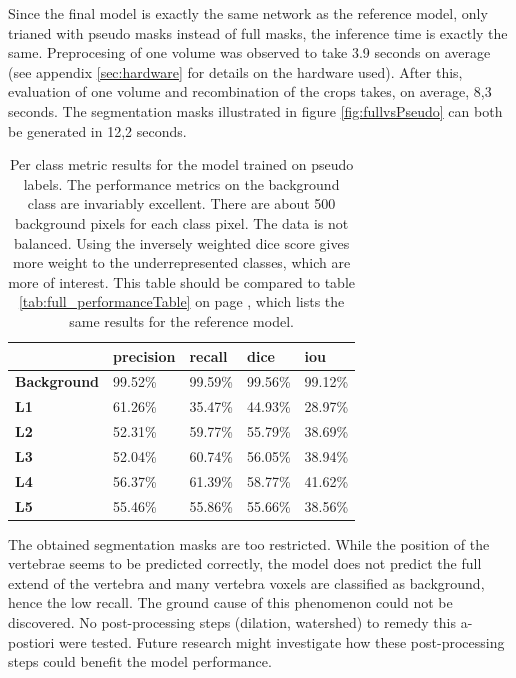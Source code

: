 \par{
    Since the final model is exactly the same network as the reference model, only trianed with pseudo masks instead of full masks, the inference time is exactly the same.
Preprocesing of one volume was observed to take 3.9 seconds on average (see appendix \ref{sec:hardware} for details on the hardware used).
After this, evaluation of one volume and recombination of the crops takes, on average, 8,3 seconds.
The segmentation masks illustrated in figure \ref{fig:fullvsPseudo} can both be generated in 12,2 seconds.
}

\begin{table}
    \begin{tabular}{l|llll}
        \toprule
                            & \textbf{precision} & \textbf{recall} & \textbf{dice} & \textbf{iou} \\ \hline
\textbf{Background} & 99.52\%            & 99.59\%         & 99.56\%       & 99.12\%      \\
\textbf{L1}         & 61.26\%            & 35.47\%         & 44.93\%       & 28.97\%      \\
\textbf{L2}         & 52.31\%            & 59.77\%         & 55.79\%       & 38.69\%      \\
\textbf{L3}         & 52.04\%            & 60.74\%         & 56.05\%       & 38.94\%      \\
\textbf{L4}         & 56.37\%            & 61.39\%         & 58.77\%       & 41.62\%      \\
\textbf{L5}         & 55.46\%            & 55.86\%         & 55.66\%       & 38.56\%       \\
        \bottomrule
        \end{tabular}
    
        \caption{Per class metric results for the model trained on pseudo labels. 
        The performance metrics on the background class are invariably excellent. There are about 500 background pixels for each class pixel. The data is not balanced.
        Using the inversely weighted dice score gives more weight to the underrepresented classes, which are more of interest.
        This table should be compared to table \ref{tab:full_performanceTable} on page \pageref{tab:full_performanceTable}, which lists the same results for the reference model.
        }
    \end{table}

\par{
    The obtained segmentation masks are too restricted.
    While the position of the vertebrae seems to be predicted correctly, the model does not predict the full extend of the vertebra and many vertebra voxels are classified as background, hence the low recall.
    The ground cause of this phenomenon could not be discovered.
    No post-processing steps (dilation, watershed) to remedy this a-postiori were tested.
    Future research might investigate how these post-processing steps could benefit the model performance. 
}

